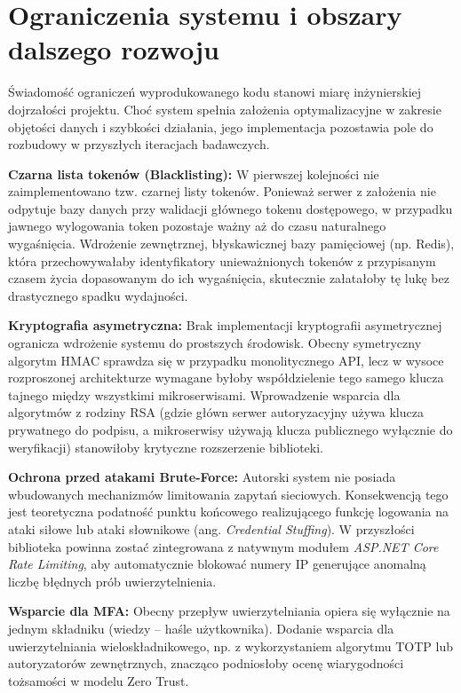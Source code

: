 \documentclass{SGGW-thesis}
\begin{document}
\clearpage

\section{Ograniczenia systemu i obszary dalszego rozwoju}

Świadomość ograniczeń wyprodukowanego kodu stanowi miarę inżynierskiej dojrzałości projektu. Choć system spełnia założenia optymalizacyjne w zakresie objętości danych i szybkości działania, jego implementacja pozostawia pole do rozbudowy w przyszłych iteracjach badawczych. 

\textbf{Czarna lista tokenów (Blacklisting):} W pierwszej kolejności nie zaimplementowano tzw. czarnej listy tokenów. Ponieważ serwer z założenia nie odpytuje bazy danych przy walidacji głównego tokenu dostępowego, w przypadku jawnego wylogowania token pozostaje ważny aż do czasu naturalnego wygaśnięcia. Wdrożenie zewnętrznej, błyskawicznej bazy pamięciowej (np. Redis), która przechowywałaby identyfikatory unieważnionych tokenów z przypisanym czasem życia dopasowanym do ich wygaśnięcia, skutecznie załatałoby tę lukę bez drastycznego spadku wydajności.

\textbf{Kryptografia asymetryczna:} Brak implementacji kryptografii asymetrycznej ogranicza wdrożenie systemu do prostszych środowisk. Obecny symetryczny algorytm HMAC sprawdza się w przypadku monolitycznego API, lecz w wysoce rozproszonej architekturze wymagane byłoby współdzielenie tego samego klucza tajnego między wszystkimi mikroserwisami. Wprowadzenie wsparcia dla algorytmów z rodziny RSA (gdzie główn serwer autoryzacyjny używa klucza prywatnego do podpisu, a mikroserwisy używają klucza publicznego wyłącznie do weryfikacji) stanowiłoby krytyczne rozszerzenie biblioteki.

\textbf{Ochrona przed atakami Brute-Force:} Autorski system nie posiada wbudowanych mechanizmów limitowania zapytań sieciowych. Konsekwencją tego jest teoretyczna podatność punktu końcowego realizującego funkcję logowania na ataki siłowe lub ataki słownikowe (ang. \textit{Credential Stuffing}). W przyszłości biblioteka powinna zostać zintegrowana z natywnym modułem \textit{ASP.NET Core Rate Limiting}, aby automatycznie blokować numery IP generujące anomalną liczbę błędnych prób uwierzytelnienia.

\textbf{Wsparcie dla MFA:} Obecny przepływ uwierzytelniania opiera się wyłącznie na jednym składniku (wiedzy – haśle użytkownika). Dodanie wsparcia dla uwierzytelniania wieloskładnikowego, np. z wykorzystaniem algorytmu TOTP lub autoryzatorów zewnętrznych, znacząco podniosłoby ocenę wiarygodności tożsamości w modelu Zero Trust.
\end{document}
